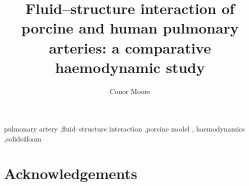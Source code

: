 \documentclass[preprint,12pt,authoryear]{elsarticle}
\begin{document}
\begin{frontmatter}
\title{Fluid--structure interaction of porcine and human pulmonary arteries: a comparative haemodynamic study}

\author[ucd]{Conor Moore}

\begin{abstract}

\end{abstract}

\begin{keyword}
pulmonary artery \sep fluid--structure interaction \sep porcine model \sep
haemodynamics \sep solids4foam
\end{keyword}
\end{frontmatter}

\linenumbers







\section*{Acknowledgements}



\appendix

\end{document}
